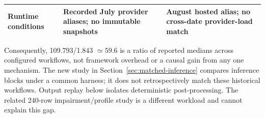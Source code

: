 \documentclass[journal]{IEEEtran}
\newif\ifshowrevisions
\newenvironment{revision}{\begingroup\ifshowrevisions\color{blue}\else\color{black}\fi}{\endgroup}
\begin{document}
\begin{revision}
\begin{revision}
\begin{table}[!t]
\begin{tabular}{p{}p{}p{}}
Runtime conditions & Recorded July provider aliases; no immutable snapshots & August hosted alias; no cross-date provider-load match \\
\bottomrule
\end{tabular}
\end{table}
Consequently, 109.793/1.843 $\simeq59.6$ is a ratio of reported medians across
configured workflows, not framework overhead or a causal gain from any one
mechanism. The new study in Section~\ref{sec:matched-inference} compares
inference blocks under a common harness; it does not retrospectively match
these historical workflows. Output replay below isolates deterministic
post-processing. The related 240-row
impairment/profile study is a different workload and cannot explain this gap.
\end{revision}
\end{revision}
\end{document}
